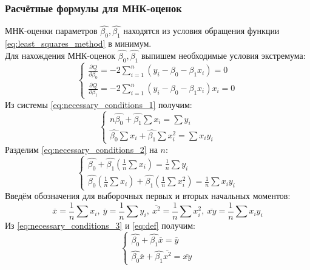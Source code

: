 \documentclass[main.tex]{subfiles}
\begin{document}
\subsubsection{Расчётные формулы для МНК-оценок}
МНК-оценки параметров $\hat{\beta_0}, \hat{\beta_1}$ находятся из условия обращения функции \eqref{eq:least_squares_method} в минимум. \\
Для нахождения МНК-оценок $\hat{\beta_0}, \hat{\beta_1}$ выпишем необходимые условия экстремума:
\begin{equation} \label{eq:necessary_conditions_1}
	\begin{cases}
		\frac{\partial Q}{\partial \beta_0} = -2 \sum_{i=1}^{n} (y_i - \beta_0 - \beta_1 x_i) = 0 \\
		\frac{\partial Q}{\partial \beta_1} = -2 \sum_{i=1}^{n} (y_i - \beta_0 - \beta_1 x_i)x_i = 0 
	\end{cases}
\end{equation}
Из системы \eqref{eq:necessary_conditions_1} получим:
\begin{equation}
	\begin{cases} \label{eq:necessary_conditions_2}
		n \hat{\beta_0} + \hat{\beta_1} \sum x_i = \sum y_i \\
		\hat{\beta_0} \sum x_i + \hat{\beta_1} \sum x_{i}^2 = \sum x_i y_i
	\end{cases}
\end{equation}
Разделим \eqref{eq:necessary_conditions_2} на $n$:
\begin{equation} \label{eq:necessary_conditions_3}
	\begin{cases}
		\hat{\beta_0} + \hat{\beta_1} (\frac{1}{n} \sum x_i) = \frac{1}{n} \sum y_i \\
		\hat{\beta_0} (\frac{1}{n} \sum x_i) + \hat{\beta_1} (\frac{1}{n} \sum x_{i}^2) = \frac{1}{n} \sum x_i y_i
	\end{cases}
\end{equation}
Введём обозначения для выборочных первых и вторых начальных моментов:
\begin{equation} \label{eq:def}
	\overline{x} = \frac{1}{n} \sum x_i, \ \overline{y} = \frac{1}{n} \sum y_i, \ \overline{x^2} = \frac{1}{n} \sum x_{i}^2, \ \overline{x y} = \frac{1}{n} \sum x_i y_i
\end{equation}
Из \eqref{eq:necessary_conditions_3} и \eqref{eq:def} получим:
\begin{equation} \label{eq:necessary_conditions_fin}
	\begin{cases}
		\hat{\beta_0} + \hat{\beta_1} \overline{x} = \overline{y} \\
		\hat{\beta_0} \overline{x} + \hat{\beta_1} \overline{x^2} = \overline{x y}
	\end{cases}
\end{equation}
\end{document}
